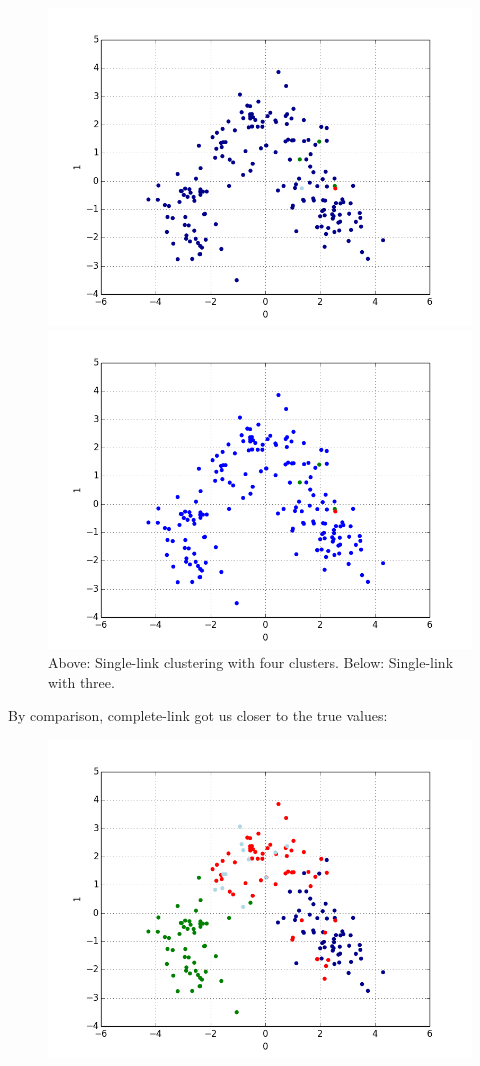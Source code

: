 \documentclass{article}
\begin{document}
\begin{enumerate}
\begin{figure}[H]
			\includegraphics[scale=0.5]{HW6single4.png}
			\caption{Above: Single-link clustering with four clusters. Below: Single-link with three.}
			\includegraphics[scale=0.5]{HW6single3.png}
		\end{figure}
		By comparison, complete-link got us closer to the true values:
		\begin{figure}[H]
			\includegraphics[scale=0.5]{HW6complete4.png}

\end{figure}
\end{enumerate}
\end{document}
